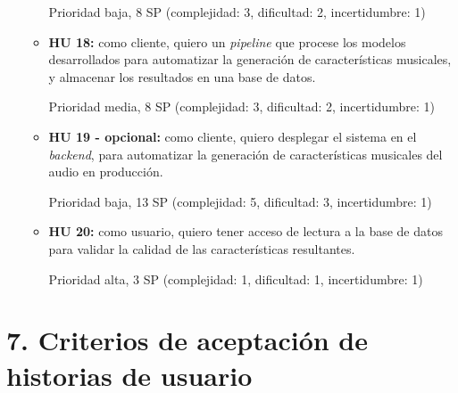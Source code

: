 \documentclass[
11pt, %
]{charter}
\begin{document}
\begin{itemize}
\begin{itemize}
      Prioridad baja, 8 SP (complejidad: 3, dificultad: 2, incertidumbre: 1)
      \item \textbf{HU 18:}
      como cliente, quiero un \textit{pipeline} que procese los modelos desarrollados para automatizar la generación de características musicales, y almacenar los resultados en una base de datos.
      
      Prioridad media, 8 SP (complejidad: 3, dificultad: 2, incertidumbre: 1)
      \item \textbf{HU 19 - opcional:}
      como cliente, quiero desplegar el sistema en el \textit{backend}, para automatizar la generación de características musicales del audio en producción.
      
      Prioridad baja, 13 SP (complejidad: 5, dificultad: 3, incertidumbre: 1)
      \item \textbf{HU 20:}
      como usuario, quiero tener acceso de lectura a la base de datos para validar la calidad de las características resultantes.
      
      Prioridad alta, 3 SP (complejidad: 1, dificultad: 1, incertidumbre: 1)      
    \end{itemize}
\end{itemize}


\section{7. Criterios de aceptación de historias de usuario}
\label{sec:criteriosAceptacion}


\end{document}
